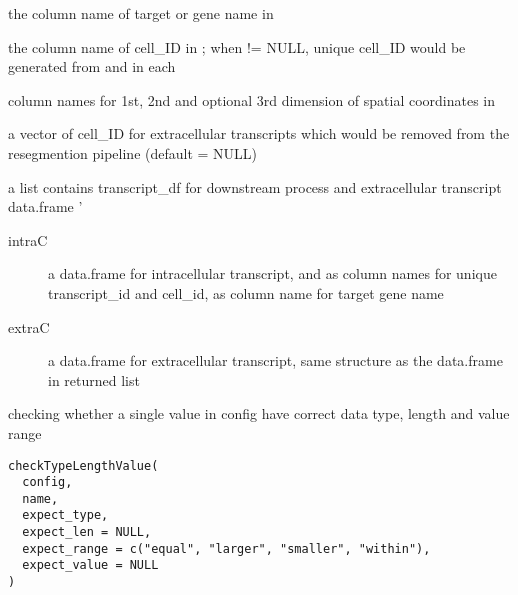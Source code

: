 \documentclass[letterpaper]{book}
\begin{document}
\begin{Arguments}
\begin{ldescription}
\item[\code{transGene\_coln}] the column name of target or gene name in 

\item[\code{cellID\_coln}] the column name of cell\_ID in ; when  != NULL, unique cell\_ID would be generated from  and  in each 

\item[\code{spatLocs\_colns}] column names for 1st, 2nd and optional 3rd dimension of spatial coordinates in 

\item[\code{extracellular\_cellID}] a vector of cell\_ID for extracellular transcripts which would be removed from the resegmention pipeline (default = NULL)
\end{ldescription}
\end{Arguments}
%
\begin{Value}
a list contains transcript\_df for downstream process and extracellular transcript data.frame
' \begin{description}

\item[intraC] a data.frame for intracellular transcript,  and  as column names for unique transcript\_id and cell\_id,  as column name for target gene name
\item[extraC] a data.frame for extracellular transcript, same structure as the  data.frame in returned list

\end{description}

\end{Value}
%
\begin{Description}
checking whether a single value in config have correct data type, length and value range
\end{Description}
%
\begin{Usage}
\begin{verbatim}
checkTypeLengthValue(
  config,
  name,
  expect_type,
  expect_len = NULL,
  expect_range = c("equal", "larger", "smaller", "within"),
  expect_value = NULL
)
\end{verbatim}
\end{Usage}
%
\end{document}
